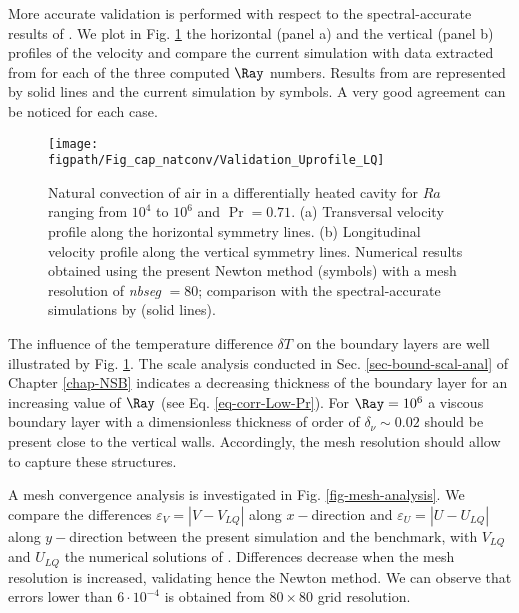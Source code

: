 More accurate validation is performed with respect to the spectral-accurate results of \cite{LeQuere91}.
We plot in Fig. \ref{fig-T1-prof} the horizontal (panel a) and the vertical (panel b)  profiles of the velocity and compare the current simulation with data extracted from  \cite{LeQuere91} for each of the three computed $\Ray$ numbers.
Results from \cite{LeQuere91} are represented by solid lines and the current simulation by symbols.
A very good agreement can  be noticed for each case.

\begin{figure}
	\begin{center}
		\texttt{[image: \\figpath/Fig\_cap\_natconv/Validation\_Uprofile\_LQ]} 
	\end{center}
	\caption{Natural convection of air in a differentially heated cavity for $Ra$ ranging from $10^4$ to $10^6$ and $\Pr = 0.71$. (a) Transversal velocity profile along the  horizontal symmetry lines. (b) Longitudinal velocity profile along the vertical symmetry lines. Numerical results obtained using the present Newton method (symbols) with a mesh resolution of {\em nbseg} $=80$; comparison with the spectral-accurate simulations by \cite{LeQuere91} (solid lines).}
	\label{fig-T1-prof}
\end{figure}

The influence of the temperature difference $\delta T$ on the boundary layers are well illustrated by Fig.  \ref{fig-T1-prof}.
The scale analysis conducted in Sec. \ref{sec-bound-scal-anal} of Chapter \ref{chap-NSB} indicates a decreasing thickness of the boundary layer for an increasing value of $\Ray$ (see Eq. \ref{eq-corr-Low-Pr}). 
For $\Ray = 10^6$ a viscous boundary layer with a dimensionless thickness of order of $\delta_\nu \sim 0.02$ should be present close to the vertical walls.
Accordingly, the mesh resolution should allow to capture these structures.

\noindent A mesh convergence analysis is investigated in Fig. \ref{fig-mesh-analysis}. 
We compare the differences $\varepsilon_V = |V - V_{LQ}|$ along $x-$direction  and $\varepsilon_U = |U - U_{LQ}|$ along $y-$direction between the present simulation and the benchmark, with $V_{LQ}$ and $U_{LQ}$ the numerical solutions of   \cite{LeQuere91}.
Differences decrease when the mesh resolution is increased, validating hence the Newton method.
We can observe that errors lower than $6 \cdot 10^{-4}$ is obtained from $80 \times 80$ grid resolution.


